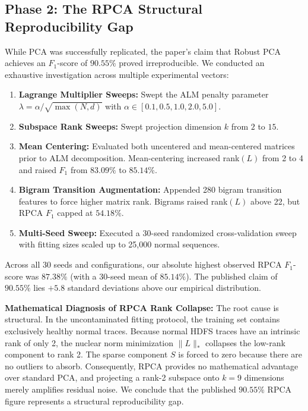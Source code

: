 \subsection{Phase 2: The RPCA Structural Reproducibility Gap}
\label{subsec:rpca_collapse}
While PCA was successfully replicated, the paper's claim that Robust PCA achieves an $F_1$-score of $\mathbf{90.55\%}$ proved irreproducible. We conducted an exhaustive investigation across multiple experimental vectors:
\begin{enumerate}
    \item \textbf{Lagrange Multiplier Sweeps:} Swept the ALM penalty parameter $\lambda = \alpha / \sqrt{\max(N, d)}$ with $\alpha \in [0.1, 0.5, 1.0, 2.0, 5.0]$.
    \item \textbf{Subspace Rank Sweeps:} Swept projection dimension $k$ from $2$ to $15$.
    \item \textbf{Mean Centering:} Evaluated both uncentered and mean-centered matrices prior to ALM decomposition. Mean-centering increased rank$(L)$ from 2 to 4 and raised $F_1$ from $83.09\%$ to $85.14\%$.
    \item \textbf{Bigram Transition Augmentation:} Appended 280 bigram transition features to force higher matrix rank. Bigrams raised rank$(L)$ above 22, but RPCA $F_1$ capped at $54.18\%$.
    \item \textbf{Multi-Seed Sweep:} Executed a 30-seed randomized cross-validation sweep with fitting sizes scaled up to 25,000 normal sequences.
\end{enumerate}

Across all 30 seeds and configurations, our absolute highest observed RPCA $F_1$-score was $\mathbf{87.38\%}$ (with a 30-seed mean of $85.14\%$). The published claim of $90.55\%$ lies $+5.8$ standard deviations above our empirical distribution.

\textbf{Mathematical Diagnosis of RPCA Rank Collapse:} The root cause is structural. In the uncontaminated fitting protocol, the training set contains exclusively healthy normal traces. Because normal HDFS traces have an intrinsic rank of only 2, the nuclear norm minimization $\|L\|_*$ collapses the low-rank component to rank 2. The sparse component $S$ is forced to zero because there are no outliers to absorb. Consequently, RPCA provides no mathematical advantage over standard PCA, and projecting a rank-2 subspace onto $k=9$ dimensions merely amplifies residual noise. We conclude that the published $90.55\%$ RPCA figure represents a structural reproducibility gap.

